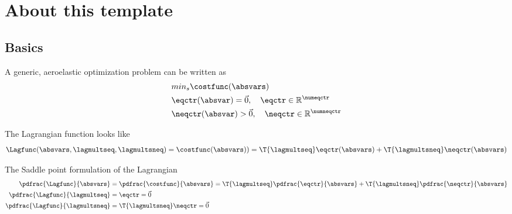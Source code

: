 \documentclass[../main.tex]{subfiles}
\begin{document}
\setlength{\delimitershortfall}{0pt}
\section{About this template}\label{sec:about}



\subsection{Basics}

A generic, aeroelastic optimization problem can be written as
\begin{align}\label{eq:generic_optimization_problem}
&min_s \costfunc(\absvars) \\%
&\eqctr(\absvar)=\vec{0},~~~\eqctr \in \mathbb{R}^{\numeqctr}\\
&\neqctr(\absvar)>\vec{0},~~~\neqctr \in \mathbb{R}^{\numneqctr}
\end{align}



The Lagrangian function looks like
\begin{align}\label{eq:lagrangian_of_optimization}
\Lagfunc(\absvars,\lagmultseq,\lagmultsneq)=\costfunc(\absvars))=\T{\lagmultseq} \eqctr(\absvars) + \T{\lagmultsneq}\neqctr(\absvars) \\
\end{align}

The Saddle point formulation of the Lagrangian
\begin{align}\label{eq:saddlepoint_optimization}
\pdfrac{\Lagfunc}{\absvars}&=\pdfrac{\costfunc}{\absvars}=\T{\lagmultseq}\pdfrac{\eqctr}{\absvars}+\T{\lagmultsneq}\pdfrac{\neqctr}{\absvars} \\
\pdfrac{\Lagfunc}{\lagmultseq}&=\eqctr=\vec{0} \\
\pdfrac{\Lagfunc}{\lagmultsneq}&=\T{\lagmultsneq}\neqctr=\vec{0}
\end{align}


\def\PPLagfuncBYabsvars{\ppdfrac{\Lagfunc}{\absvars}}
\def\PLagfuncBYabsvars{\pdfrac{\Lagfunc}{\absvars}}
\def\PneqctrBYabsvars{\pdfrac{\neqctr}{\absvar}}
\def\PeqctrBYabsvars{\pdfrac{\eqctr}{\absvar}}
\end{document}
